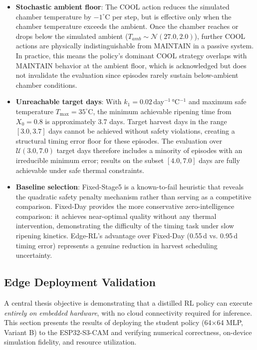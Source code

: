 \begin{itemize}
    \item \textbf{Stochastic ambient floor}: The COOL action reduces the simulated chamber temperature by $-1^\circ$C per step, but is effective only when the chamber temperature exceeds the ambient. Once the chamber reaches or drops below the simulated ambient ($T_{amb} \sim \mathcal{N}(27.0, 2.0)$), further COOL actions are physically indistinguishable from MAINTAIN in a passive system. In practice, this means the policy's dominant COOL strategy overlaps with MAINTAIN behavior at the ambient floor, which is acknowledged but does not invalidate the evaluation since episodes rarely sustain below-ambient chamber conditions.

    \item \textbf{Unreachable target days}: With $k_1 = 0.02$\,day$^{-1}$\,°C$^{-1}$ and maximum safe temperature $T_{\max} = 35^\circ$C, the minimum achievable ripening time from $X_0 = 0.8$ is approximately 3.7 days. Target harvest days in the range $[3.0, 3.7]$ days cannot be achieved without safety violations, creating a structural timing error floor for these episodes. The evaluation over $\mathcal{U}(3.0, 7.0)$ target days therefore includes a minority of episodes with an irreducible minimum error; results on the subset $[4.0, 7.0]$ days are fully achievable under safe thermal constraints.

    \item \textbf{Baseline selection}: Fixed-Stage5 is a known-to-fail heuristic that reveals the quadratic safety penalty mechanism rather than serving as a competitive comparison. Fixed-Day provides the more conservative zero-intelligence comparison: it achieves near-optimal quality without any thermal intervention, demonstrating the difficulty of the timing task under slow ripening kinetics. Edge-RL's advantage over Fixed-Day (0.55\,d vs. 0.95\,d timing error) represents a genuine reduction in harvest scheduling uncertainty.
\end{itemize}

\subsection{Edge Deployment Validation}
\label{sec:edge_deploy}

A central thesis objective is demonstrating that a distilled RL policy can execute \emph{entirely on embedded hardware}, with no cloud connectivity required for inference. This section presents the results of deploying the student policy (64$\times$64 MLP, Variant B) to the ESP32-S3-CAM and verifying numerical correctness, on-device simulation fidelity, and resource utilization.

